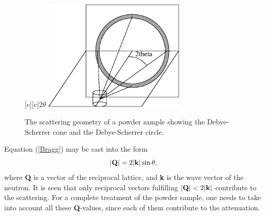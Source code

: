 \begin{figure}
  \begin{center}
    [c][c]{$2\theta$}
    \includegraphics[width=0.6\textwidth]{figures/powder.eps}
  \end{center}
\caption{The scattering geometry of a powder sample showing the
Debye-Scherrer cone and the Debye-Scherrer circle.} 
\label{coneFig}
\end{figure}

Equation (\ref{Bragg}) may be cast into the form
\begin{equation}
|{\bf Q}| = 2 |{\bf k}| \sin \theta ,
\end{equation}
where {\bf Q} is a vector of the reciprocal lattice, and {\bf k} is
the wave vector of the neutron. It is seen that only
reciprocal vectors fulfilling $|{\bf Q}| < 2 |{\bf k}|$ 
contribute to the scattering.
For a complete treatment of the powder sample, one needs to take
into account all these {\bf Q}-values, since each of them contribute 
to the attenuation.

